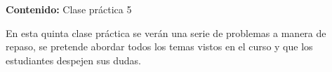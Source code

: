 {\Large
    \textbf{Contenido:} Clase práctica 5
}

En esta quinta clase práctica se verán una serie de problemas a manera de repaso, se pretende abordar todos los temas vistos en el curso y que los estudiantes despejen sus dudas.